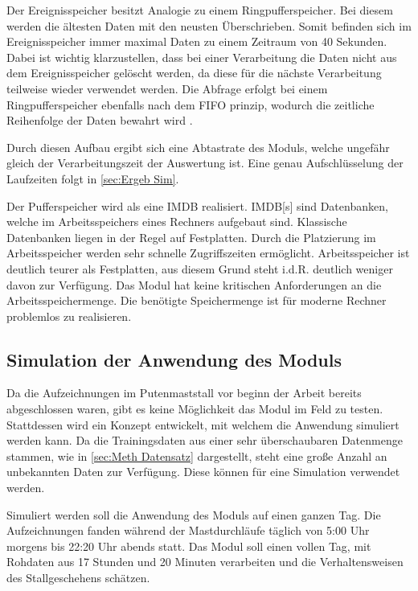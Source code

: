 Der Ereignisspeicher besitzt Analogie zu einem Ringpufferspeicher. Bei diesem werden die ältesten Daten mit den neusten Überschrieben. Somit befinden sich im Ereignisspeicher immer maximal Daten zu einem Zeitraum von 40 Sekunden. Dabei ist wichtig klarzustellen, dass bei einer Verarbeitung die Daten nicht aus dem Ereignisspeicher gelöscht werden, da diese für die nächste Verarbeitung teilweise wieder verwendet werden. Die Abfrage erfolgt bei einem Ringpufferspeicher ebenfalls nach dem \acrshort{FIFO} prinzip, wodurch die zeitliche Reihenfolge der Daten bewahrt wird \cite{Sedgewick.2011}.\par

Durch diesen Aufbau ergibt sich eine Abtastrate des Moduls, welche ungefähr gleich der Verarbeitungszeit der Auswertung ist. Eine genau Aufschlüsselung der Laufzeiten folgt in \autoref{sec:Ergeb Sim}. \par

Der Pufferspeicher wird als eine \gls{IMDB} realisiert. \gls{IMDB}[s] sind Datenbanken, welche im Arbeitsspeichers eines Rechners aufgebaut sind. Klassische Datenbanken liegen in der Regel auf Festplatten. Durch die Platzierung im Arbeitsspeicher werden sehr schnelle Zugriffszeiten ermöglicht. Arbeitsspeicher ist deutlich teurer als Festplatten, aus diesem Grund steht i.d.R. deutlich weniger davon zur Verfügung. Das Modul hat keine kritischen Anforderungen an die Arbeitsspeichermenge. Die benötigte Speichermenge ist für moderne Rechner problemlos zu realisieren. \par


\subsection{Simulation der Anwendung des Moduls} \label{sec:Meth Sim}
Da die Aufzeichnungen im Putenmaststall vor beginn der Arbeit bereits abgeschlossen waren, gibt es keine Möglichkeit das Modul im Feld zu testen. Stattdessen wird ein Konzept entwickelt, mit welchem die Anwendung simuliert werden kann. Da die Trainingsdaten aus einer sehr überschaubaren Datenmenge stammen, wie in \autoref{sec:Meth Datensatz} dargestellt, steht eine große Anzahl an unbekannten Daten zur Verfügung. Diese können für eine Simulation verwendet werden. \par

Simuliert werden soll die Anwendung des Moduls auf einen ganzen Tag. Die Aufzeichnungen fanden während der Mastdurchläufe täglich von 5:00 Uhr morgens bis 22:20 Uhr abends statt. Das Modul soll einen vollen Tag, mit Rohdaten aus 17 Stunden und 20 Minuten verarbeiten und die Verhaltensweisen des Stallgeschehens schätzen.\par

